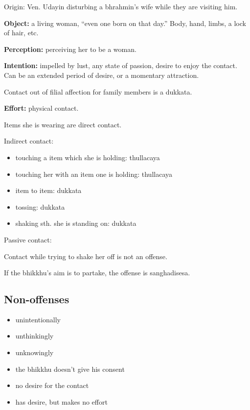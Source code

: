 \begin{multicols}{2}

Origin: Ven. Udayin disturbing a bhrahmin's wife while they are visiting
him.

\textbf{Object:} a living woman, ``even one born on that day.'' Body,
hand, limbs, a lock of hair, etc.

\textbf{Perception:} perceiving her to be a woman.

\textbf{Intention:} impelled by lust, any state of passion, desire to
enjoy the contact. Can be an extended period of desire, or a momentary
attraction.

Contact out of filial affection for family members is a dukkata.

\textbf{Effort:} physical contact.

Items she is wearing are direct contact.

Indirect contact:

\begin{itemize}
\tightlist
\item
  touching a item which she is holding: thullacaya
\item
  touching her with an item one is holding: thullacaya
\item
  item to item: dukkata
\item
  tossing: dukkata
\item
  shaking sth. she is standing on: dukkata
\end{itemize}

Passive contact:

Contact while trying to shake her off is not an offense.

If the bhikkhu's aim is to partake, the offense is sanghadisesa.

\subsection{Non-offenses}

\begin{itemize}
\tightlist
\item
  unintentionally
\item
  unthinkingly
\item
  unknowingly
\item
  the bhikkhu doesn't give his consent
\item
  no desire for the contact
\item
  has desire, but makes no effort
\end{itemize}

\end{multicols}

